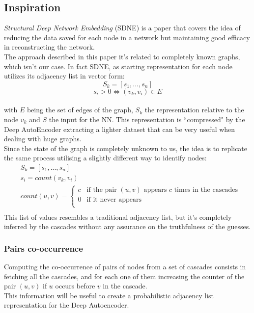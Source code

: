 \documentclass{article}
\begin{document}
			\subsection{Inspiration}
			\textit{Structural Deep Network Embedding} (SDNE) is a paper that covers the idea of reducing the data saved for each node in a network but maintaining good efficacy in reconstructing the network.\\
			The approach described in this paper it's related to completely known graphs, which isn't our case. In fact SDNE, as starting representation for each node utilizes its adjacency list in vector form:
			$$ S_{k} = [s_{1}, ... , s_{n}] $$
			$$ s_{i} > 0 \iff (v_{k},v_{i})\in E $$\\
			with $E$ being the set of edges of the graph, $S_{k}$ the representation relative to the node $v_{k}$ and $S$ the input for the NN. This representation is \textquotedblleft compressed" by the Deep AutoEncoder extracting a lighter dataset that can be very useful when dealing with huge graphs.\\
			Since the state of the graph is completely unknown to us, the idea is to replicate the same process utilising a slightly different way to identify nodes:
			\begin{equation}
			\begin{aligned}
			& S_{k} = [s_{1}, ... , s_{n}]\\
			& s_{i} = count(v_{k},v_{i})\\
			& count(u,v) =
			\begin{cases}
			c & \text{if the pair } (u,v) \text{  appears } c \text{ times in the cascades}\\
			0 & \text{if it never appears}\\
			\end{cases}\\
			\end{aligned}
			\end{equation}
			This list of values resembles a traditional adjacency list, but it's completely inferred by the cascades without any assurance on the truthfulness of the guesses.\\
			
			\subsubsection{Pairs co-occurrence}
			Computing the co-occurrence of pairs of nodes from a set of cascades consists in fetching all the cascades, and for each one of them increasing the counter of the pair $(u,v)$ if $u$ occurs before $v$ in the cascade.\\
			This information will be useful to create a probabilistic adjacency list representation for the Deep Autoencoder.
\end{document}
